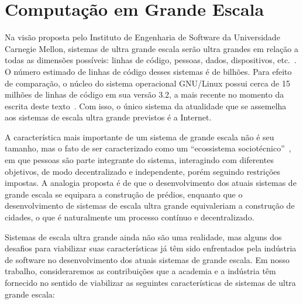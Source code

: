 
\chapter{Computação em Grande Escala}
\label{cap:escala}

Na visão proposta pelo Instituto de Engenharia de Software da Universidade Carnegie Mellon, sistemas de ultra grande escala serão ultra grandes em relação a todas as dimensões possíveis: linhas de código, pessoas, dados, dispositivos, etc.~\cite{CarnegieMellon2006ULS}. O número estimado de linhas de código desses sistemas é de bilhões. Para efeito de comparação, o núcleo do sistema operacional GNU/Linux possui cerca de 15 milhões de linhas de código em sua versão 3.2, a mais recente no momento da escrita deste texto~\cite{Leemhuis2012Statistics}. Com isso, o único sistema da atualidade que se assemelha aos sistemas de escala ultra grande previstos é a Internet. 

 

A característica mais importante de um sistema de grande escala não é seu tamanho, mas o fato de ser caracterizado como um ``ecossistema sociotécnico''~\cite{CarnegieMellon2006ULS}, em que pessoas são parte integrante do sistema, interagindo com diferentes objetivos, de modo decentralizado e independente, porém seguindo restrições impostas. A analogia proposta é de que o desenvolvimento dos atuais sistemas de grande escala se equipara a construção de prédios, enquanto que o desenvolvimento de sistemas de escala ultra grande equivaleriam a construção de cidades, o que é naturalmente um processo contínuo e decentralizado.

Sistemas de escala ultra grande ainda não são uma realidade, mas alguns dos desafios para viabilizar suas características já têm sido enfrentados pela indústria de software no desenvolvimento dos atuais sistemas de grande escala. Em nosso trabalho, consideraremos as contribuições que a academia e a indústria têm fornecido no sentido de viabilizar as seguintes características de sistemas de ultra grande escala:

